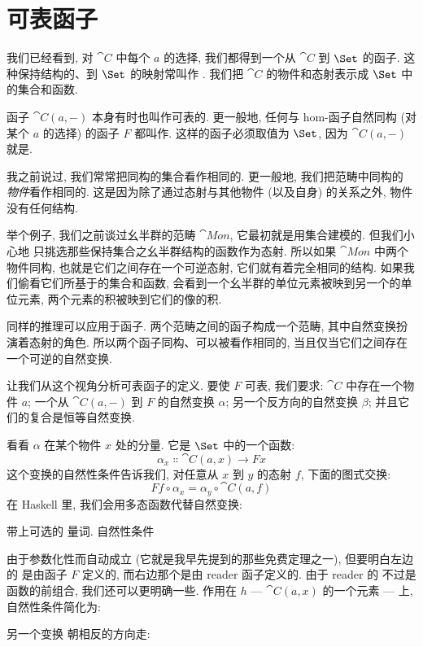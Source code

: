 \section{可表函子}

我们已经看到, 对 $\cat{C}$ 中每个 $a$ 的选择, 我们都得到一个从
$\cat{C}$ 到 $\Set$ 的函子. 这种保持结构的、到 $\Set$ 的映射常叫作
. 我们把 $\cat{C}$ 的物件和态射表示成
$\Set$ 中的集合和函数.

函子 $\cat{C}(a, -)$ 本身有时也叫作可表的. 更一般地, 任何与 hom-函子自然同构
(对某个 $a$ 的选择) 的函子 $F$ 都叫作.
这样的函子必须取值为 $\Set$, 因为 $\cat{C}(a, -)$ 就是.

我之前说过, 我们常常把同构的集合看作相同的. 更一般地, 我们把范畴中同构的
\emph{物件}看作相同的. 这是因为除了通过态射与其他物件 (以及自身) 的关系之外,
物件没有任何结构.

举个例子, 我们之前谈过幺半群的范畴 $\cat{Mon}$, 它最初就是用集合建模的. 但我们小心地
只挑选那些保持集合之幺半群结构的函数作为态射. 所以如果 $\cat{Mon}$ 中两个物件同构,
也就是它们之间存在一个可逆态射, 它们就有着完全相同的结构. 如果我们偷看它们所基于的集合和函数,
会看到一个幺半群的单位元素被映到另一个的单位元素, 两个元素的积被映到它们的像的积.

同样的推理可以应用于函子. 两个范畴之间的函子构成一个范畴, 其中自然变换扮演着态射的角色.
所以两个函子同构、可以被看作相同的, 当且仅当它们之间存在一个可逆的自然变换.

让我们从这个视角分析可表函子的定义. 要使 $F$ 可表, 我们要求: $\cat{C}$
中存在一个物件 $a$; 一个从 $\cat{C}(a, -)$ 到 $F$ 的自然变换
$\alpha$; 另一个反方向的自然变换 $\beta$; 并且它们的复合是恒等自然变换.

看看 $\alpha$ 在某个物件 $x$ 处的分量. 它是 $\Set$ 中的一个函数:
\[\alpha_x \Colon \cat{C}(a, x) \to F x\]
这个变换的自然性条件告诉我们, 对任意从 $x$ 到 $y$ 的态射 $f$,
下面的图式交换:
\[F f \circ \alpha_x = \alpha_y \circ \cat{C}(a, f)\]
在 Haskell 里, 我们会用多态函数代替自然变换:

带上可选的  量词. 自然性条件

由于参数化性而自动成立 (它就是我早先提到的那些免费定理之一), 但要明白左边的
 是由函子 $F$ 定义的, 而右边那个是由 reader 函子定义的. 由于 reader
的  不过是函数的前组合, 我们还可以更明确一些. 作用在 $h$ ---
$\cat{C}(a, x)$ 的一个元素 --- 上, 自然性条件简化为:

另一个变换  朝相反的方向走:

